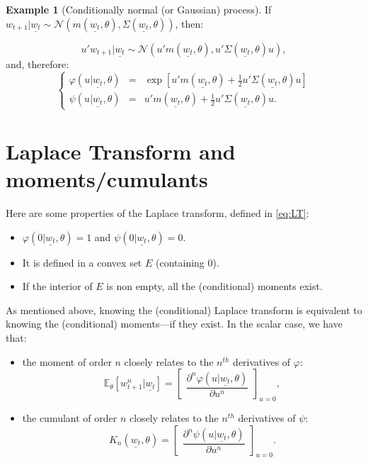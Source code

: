 \documentclass[
  12pt,
]{book}
\providecommand{\tightlist}{%
  \setlength{\itemsep}{0pt}\setlength{\parskip}{0pt}}
\theoremstyle{definition}
\theoremstyle{definition}
\newtheorem{example}{Example}[chapter]
\theoremstyle{definition}
\theoremstyle{definition}
\theoremstyle{remark}
\begin{document}
\begin{example}[Conditionally normal (or Gaussian) process]
\protect\hypertarget{exm:exGaussian}{}\label{exm:exGaussian}If \(w_{t+1}|\underline{w_t} \sim \mathcal{N}\left(m(\underline{w_t},\theta), \Sigma(\underline{w_t},\theta)\right)\), then:

\[
u'w_{t+1}|\underline{w_t} \sim \mathcal{N}\left(u'm(\underline{w_t},\theta), u'\Sigma(\underline{w_t},\theta)u\right),
\]
and, therefore:
\[
\left\{
\begin{array}{ccc}
\varphi(u|\underline{w_t},\theta) &=& \exp\left[u'm(\underline{w_t},\theta)+
\frac{1}{2} u'\Sigma(\underline{w_t},\theta)u\right]\\
\psi(u|\underline{w_t},\theta) &=&
u'm(\underline{w_t},\theta) +  \frac{1}{2}
u'\Sigma(\underline{w_t},\theta)u.
\end{array}
\right.
\]
\end{example}

\hypertarget{AffineLaplace}{%
\section{Laplace Transform and moments/cumulants}\label{AffineLaplace}}

Here are some properties of the Laplace transform, defined in \eqref{eq:LT}:

\begin{itemize}
\tightlist
\item
  \(\varphi(0|\underline{w_t},\theta) = 1\) and \(\psi(0|\underline{w_t},\theta)=0\).
\item
  It is defined in a convex set \(E\) (containing \(0\)).
\item
  If the interior of \(E\) is non empty, all the (conditional) moments exist.
\end{itemize}

As mentioned above, knowing the (conditional) Laplace transform is equivalent to knowing the (conditional) moments---if they exist. In the scalar case, we have that:

\begin{itemize}
\tightlist
\item
  the moment of order \(n\) closely relates to the \(n^{th}\) derivatives of \(\varphi\):
  \[
  \mathbb{E}_{\theta}[w^n_{t+1}|\underline{w_t}] = \left[ \begin{array}{l}  \dfrac{\partial^n
  \varphi(u|\underline{w_t},\theta)}{\partial u^n}
  \end{array} \right]_{u=0},
  \]
\item
  the cumulant of order \(n\) closely relates to the \(n^{th}\) derivatives of \(\psi\):
  \[
  K_n(\underline{w_t},\theta) = \left[ \begin{array}{l}  \dfrac{\partial^n
  \psi(u|\underline{w_t},\theta)}{\partial u^n}
  \end{array} \right]_{u=0}.
  \]
\end{itemize}
\end{document}

